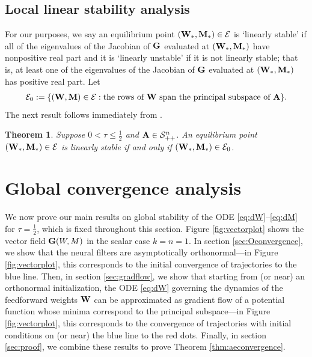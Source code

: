 \documentclass[11pt]{article}
\newtheorem{theorem}{Theorem}
\theoremstyle{definition}
\newcommand{\A}{{\bf A}}
\newcommand{\G}{{\bf G}}
\newcommand{\M}{{\bf M}}
\newcommand{\W}{{\bf W}}
\newcommand{\calE}{\mathcal{E}}
\newcommand{\calS}{\mathcal{S}}
\begin{document}
\subsection{Local linear stability analysis}    
    
For our purposes, we say an equilibrium point $(\W_\ast,\M_\ast)\in\calE$ is `linearly stable' if all of the eigenvalues of the Jacobian of $\G$ evaluated at $(\W_\ast,\M_\ast)$ have nonpositive real part and it is `linearly unstable' if it is not linearly stable; that is, at least one of the eigenvalues of the Jacobian of $\G$ evaluated at $(\W_\ast,\M_\ast)$ has positive real part. Let
\begin{align*}
    \calE_0:=\{(\W,\M)\in\calE:\text{the rows of $\W$ span the principal subspace of $\A$}\}.    
\end{align*}
The next result follows immediately from \citep[Theorem 1]{pehlevan2018similarity}.

\begin{theorem}
\label{thm:localstability}
    Suppose $0<\tau\le\frac12$ and $\A\in\calS_{++}^n$. An equilibrium point $(\W_\ast,\M_\ast)\in\calE$ is linearly stable if and only if $(\W_\ast,\M_\ast)\in\calE_0$.
\end{theorem}

\section{Global convergence analysis}
\label{sec:stable}

We now prove our main results on global stability of the ODE \eqref{eq:dW}--\eqref{eq:dM} for $\tau=\frac12$, which is fixed throughout this section. Figure \ref{fig:vectorplot} shows the vector field $\G(W,M)$ in the scalar case $k=n=1$. 
In section \ref{sec:Oconvergence}, we show that the neural filters are asymptotically orthonormal---in Figure \ref{fig:vectorplot}, this corresponds to the initial convergence of trajectories to the blue line. Then, in section \ref{sec:gradflow}, we show that starting from (or near) an orthonormal initialization, the ODE \eqref{eq:dW} governing the dynamics of the feedforward weights $\W$ can be approximated as gradient flow of a potential function whose minima correspond to the principal subspace---in Figure \ref{fig:vectorplot}, this corresponds to the convergence of trajectories with initial conditions on (or near) the blue line to the red dots. Finally, in section \ref{sec:proof}, we combine these results to prove Theorem \ref{thm:aeconvergence}.
\end{document}
